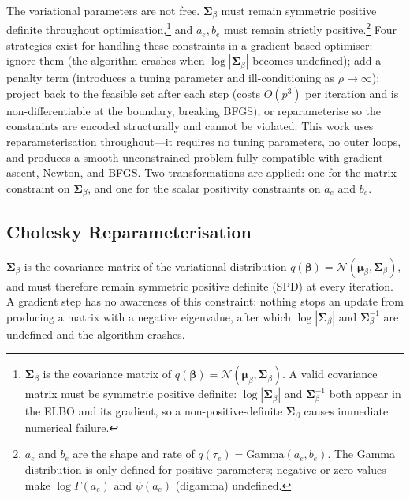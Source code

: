 \documentclass[11pt,a4paper]{article}
\newcommand{\N}{\mathcal{N}}
\begin{document}
The variational parameters are not free. $\bm{\Sigma}_\beta$ must remain symmetric positive definite throughout optimisation,\footnote{$\bm{\Sigma}_\beta$ is the covariance matrix of $q(\bm{\beta}) = \mathcal{N}(\bm{\mu}_\beta,\bm{\Sigma}_\beta)$. A valid covariance matrix must be symmetric positive definite: $\log|\bm{\Sigma}_\beta|$ and $\bm{\Sigma}_\beta^{-1}$ both appear in the ELBO and its gradient, so a non-positive-definite $\bm{\Sigma}_\beta$ causes immediate numerical failure.} and $a_e, b_e$ must remain strictly positive.\footnote{$a_e$ and $b_e$ are the shape and rate of $q(\tau_e)=\mathrm{Gamma}(a_e,b_e)$. The Gamma distribution is only defined for positive parameters; negative or zero values make $\log\Gamma(a_e)$ and $\psi(a_e)$ (digamma) undefined.} Four strategies exist for handling these constraints in a gradient-based optimiser: ignore them (the algorithm crashes when $\log|\bm{\Sigma}_\beta|$ becomes undefined); add a penalty term (introduces a tuning parameter and ill-conditioning as $\rho \to \infty$); project back to the feasible set after each step (costs $O(p^3)$ per iteration and is non-differentiable at the boundary, breaking BFGS); or reparameterise so the constraints are encoded structurally and cannot be violated. This work uses reparameterisation throughout---it requires no tuning parameters, no outer loops, and produces a smooth unconstrained problem fully compatible with gradient ascent, Newton, and BFGS. Two transformations are applied: one for the matrix constraint on $\bm{\Sigma}_\beta$, and one for the scalar positivity constraints on $a_e$ and $b_e$.

\subsection*{Cholesky Reparameterisation}

$\bm{\Sigma}_\beta$ is the covariance matrix of the variational distribution $q(\bm{\beta}) = \N(\bm{\mu}_\beta, \bm{\Sigma}_\beta)$, and must therefore remain symmetric positive definite (SPD) at every iteration. A gradient step has no awareness of this constraint: nothing stops an update from producing a matrix with a negative eigenvalue, after which $\log|\bm{\Sigma}_\beta|$ and $\bm{\Sigma}_\beta^{-1}$ are undefined and the algorithm crashes.
\end{document}
